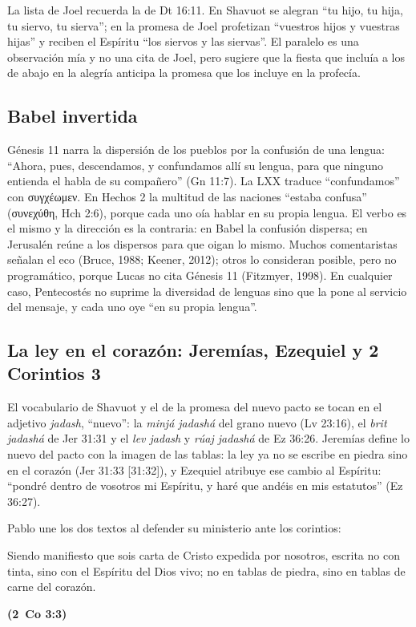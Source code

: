 \documentclass[11pt,letterpaper]{article}
\newcommand{\grc}[1]{\foreignlanguage{ancientgreek}{#1}}
\newcommand{\fuente}[1]{\par\hfill{\upshape\bfseries\small\textcolor{tierraroja}{#1}}}
\begin{document}
La lista de Joel recuerda la de Dt 16:11. En Shavuot se alegran ``tu hijo, tu hija, tu siervo, tu sierva''; en la promesa de Joel profetizan ``vuestros hijos y vuestras hijas'' y reciben el Espíritu ``los siervos y las siervas''. El paralelo es una observación mía y no una cita de Joel, pero sugiere que la fiesta que incluía a los de abajo en la alegría anticipa la promesa que los incluye en la profecía.

\subsection{Babel invertida}

Génesis 11 narra la dispersión de los pueblos por la confusión de una lengua: ``Ahora, pues, descendamos, y confundamos allí su lengua, para que ninguno entienda el habla de su compañero'' (Gn 11:7). La LXX traduce ``confundamos'' con \grc{συγχέωμεν}. En Hechos 2 la multitud de las naciones ``estaba confusa'' (\grc{συνεχύθη}, Hch 2:6), porque cada uno oía hablar en su propia lengua. El verbo es el mismo y la dirección es la contraria: en Babel la confusión dispersa; en Jerusalén reúne a los dispersos para que oigan lo mismo. Muchos comentaristas señalan el eco (Bruce, 1988; Keener, 2012); otros lo consideran posible, pero no programático, porque Lucas no cita Génesis 11 (Fitzmyer, 1998). En cualquier caso, Pentecostés no suprime la diversidad de lenguas sino que la pone al servicio del mensaje, y cada uno oye ``en su propia lengua''.

\subsection{La ley en el corazón: Jeremías, Ezequiel y 2 Corintios 3}

El vocabulario de Shavuot y el de la promesa del nuevo pacto se tocan en el adjetivo \emph{jadash}, ``nuevo'': la \emph{minjá jadashá} del grano nuevo (Lv 23:16), el \emph{brit jadashá} de Jer 31:31 y el \emph{lev jadash} y \emph{rúaj jadashá} de Ez 36:26. Jeremías define lo nuevo del pacto con la imagen de las tablas: la ley ya no se escribe en piedra sino en el corazón (Jer 31:33 [31:32]), y Ezequiel atribuye ese cambio al Espíritu: ``pondré dentro de vosotros mi Espíritu, y haré que andéis en mis estatutos'' (Ez 36:27).

Pablo une los dos textos al defender su ministerio ante los corintios:

\begin{cita}Siendo manifiesto que sois carta de Cristo expedida por nosotros, escrita no con tinta, sino con el Espíritu del Dios vivo; no en tablas de piedra, sino en tablas de carne del corazón.\fuente{(2~Co 3:3)}\end{cita}
\end{document}
